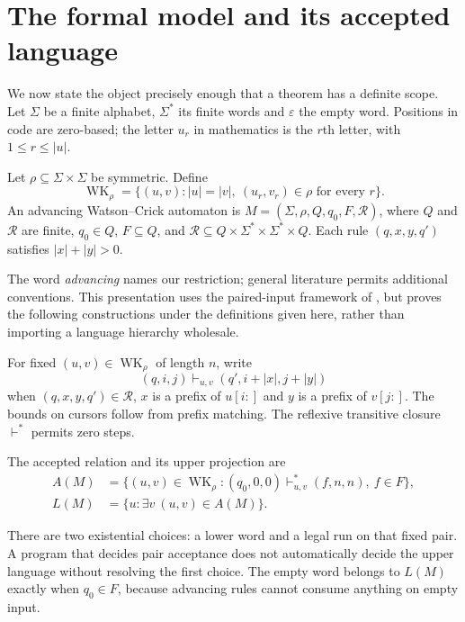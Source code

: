\section{The formal model and its accepted language}
We now state the object precisely enough that a theorem has a definite scope.
Let $\Sigma$ be a finite alphabet, $\Sigma^*$ its finite words and
$\varepsilon$ the empty word. Positions in code are zero-based; the letter
$u_r$ in mathematics is the $r$th letter, with $1\leq r\leq |u|$.

\begin{definition}
Let $\rho\subseteq\Sigma\times\Sigma$ be symmetric. Define
\[
 \operatorname{WK}_{\rho}=
 \{(u,v):|u|=|v|,\ (u_r,v_r)\in\rho\text{ for every }r\}.
\]
An advancing Watson--Crick automaton is
$M=(\Sigma,\rho,Q,q_0,F,\mathcal R)$, where $Q$ and $\mathcal R$ are finite,
$q_0\in Q$, $F\subseteq Q$, and
$\mathcal R\subseteq Q\times\Sigma^*\times\Sigma^*\times Q$.
Each rule $(q,x,y,q')$ satisfies $|x|+|y|>0$.
\end{definition}
The word \emph{advancing} names our restriction; general literature permits
additional conventions. This presentation uses the paired-input framework of
\cite{czeizler}, but proves the following constructions under the definitions
given here, rather than importing a language hierarchy wholesale.

For fixed $(u,v)\in\operatorname{WK}_\rho$ of length $n$, write
\begin{equation}
 (q,i,j)\vdash_{u,v}(q',i+|x|,j+|y|)
 \label{eq:stepformal}
\end{equation}
when $(q,x,y,q')\in\mathcal R$, $x$ is a prefix of $u[i:]$ and $y$ is a
prefix of $v[j:]$. The bounds on cursors follow from prefix matching.
The reflexive transitive closure $\vdash^*$ permits zero steps.
\begin{definition}
The accepted relation and its upper projection are
\begin{align}
 A(M)&=\{(u,v)\in\operatorname{WK}_\rho:
       (q_0,0,0)\vdash_{u,v}^*(f,n,n),\ f\in F\},\\
 L(M)&=\{u:\exists v\ (u,v)\in A(M)\}.
\end{align}
\end{definition}
There are two existential choices: a lower word and a legal run on that
fixed pair. A program that decides pair acceptance does not automatically
decide the upper language without resolving the first choice. The empty
word belongs to $L(M)$ exactly when $q_0\in F$, because advancing rules
cannot consume anything on empty input.

